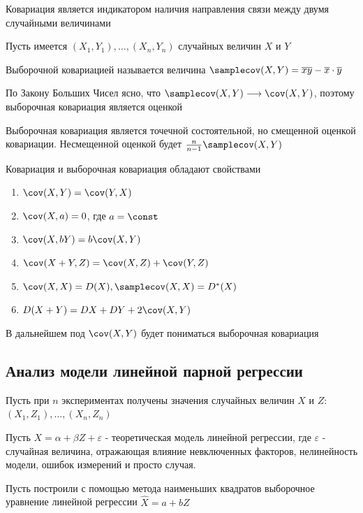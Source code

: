 \documentclass[12pt]{article}
\begin{document}
Ковариация является индикатором наличия направления связи между двумя случайными величинами

Пусть имеется $(X_1, Y_1), \dots, (X_n, Y_n)$ случайных величин $X$ и $Y$

\Def Выборочной ковариацией называется величина $\samplecov (X, Y) = \overline{xy} - \overline{x} \cdot \overline{y}$

По Закону Больших Чисел ясно, что $\samplecov (X, Y) \longrightarrow \cov (X, Y)$, поэтому выборочная ковариация является оценкой

\begin{MyTheorem}
    \Ths Выборочная ковариация является точечной состоятельной, но смещенной оценкой ковариации. 
    Несмещенной оценкой будет $\frac{n}{n - 1} \samplecov (X, Y)$
\end{MyTheorem}

Ковариация и выборочная ковариация обладают свойствами

\begin{enumerate}
    \item $\cov (X, Y) = \cov (Y, X)$
    \item $\cov (X, a) = 0$, где $a = \const$
    \item $\cov (X, bY) = b \cov (X, Y)$
    \item $\cov (X + Y, Z) = \cov (X, Z) + \cov (Y, Z)$
    \item $\cov (X, X) = D(X), \samplecov (X, X) = D^* (X)$
    \item $D(X + Y) = DX + DY + 2\cov (X, Y)$
\end{enumerate}

\Nota В дальнейшем под $\cov (X, Y)$ будет пониматься выборочная ковариация

\hypertarget{linear_regression_hypothesis}{}

\subsection{Анализ модели линейной парной регрессии}

Пусть при $n$ экспериментах получены значения случайных величин $X$ и $Z$: $(X_1, Z_1), \dots, (X_n, Z_n)$

Пусть $X = \alpha + \beta Z + \varepsilon$ - теоретическая модель линейной регрессии, где $\varepsilon$ - случайная величина,
отражающая влияние невключенных факторов, нелинейность модели, ошибок измерений и просто случая.

Пусть построили с помощью метода наименьших квадратов выборочное уравнение линейной регрессии $\hat X = a + b Z$
\end{document}
